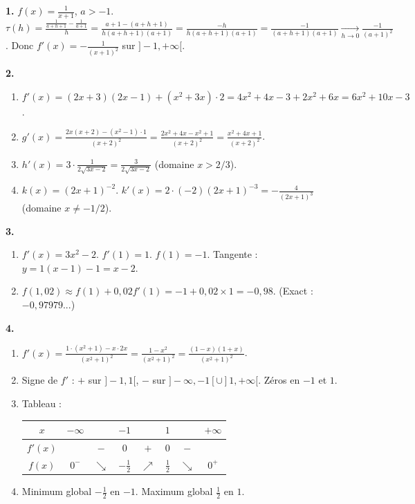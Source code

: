\documentclass[11pt]{article}
\begin{document}
\begin{corrige}
\textbf{1.} $f(x) = \frac{1}{x+1}$, $a > -1$. $\tau(h) = \frac{\frac{1}{a+h+1} - \frac{1}{a+1}}{h} = \frac{a+1 - (a+h+1)}{h(a+h+1)(a+1)} = \frac{-h}{h(a+h+1)(a+1)} = \frac{-1}{(a+h+1)(a+1)} \xrightarrow[h\to 0]{} \frac{-1}{(a+1)^2}$. Donc $f'(x) = -\frac{1}{(x+1)^2}$ sur $]-1, +\infty[$.

\textbf{2.}
\begin{enumerate}
\item $f'(x) = (2x+3)(2x-1) + (x^2+3x)\cdot 2 = 4x^2+4x-3 + 2x^2+6x = 6x^2+10x-3$.
\item $g'(x) = \frac{2x(x+2) - (x^2-1)\cdot 1}{(x+2)^2} = \frac{2x^2+4x - x^2 + 1}{(x+2)^2} = \frac{x^2+4x+1}{(x+2)^2}$.
\item $h'(x) = 3 \cdot \frac{1}{2\sqrt{3x-2}} = \frac{3}{2\sqrt{3x-2}}$ (domaine $x > 2/3$).
\item $k(x) = (2x+1)^{-2}$. $k'(x) = 2 \cdot (-2)(2x+1)^{-3} = -\frac{4}{(2x+1)^3}$ (domaine $x \neq -1/2$).
\end{enumerate}

\textbf{3.}
\begin{enumerate}
\item $f'(x) = 3x^2 - 2$. $f'(1) = 1$. $f(1) = -1$. Tangente : $y = 1(x-1) - 1 = x - 2$.
\item $f(1,02) \approx f(1) + 0,02 f'(1) = -1 + 0,02 \times 1 = -0,98$. (Exact : $-0,97979...$)
\end{enumerate}

\textbf{4.}
\begin{enumerate}
\item $f'(x) = \frac{1\cdot(x^2+1) - x\cdot 2x}{(x^2+1)^2} = \frac{1 - x^2}{(x^2+1)^2} = \frac{(1-x)(1+x)}{(x^2+1)^2}$.
\item Signe de $f'$ : $+$ sur $]-1, 1[$, $-$ sur $]-\infty, -1[ \cup ]1, +\infty[$. Zéros en $-1$ et $1$.
\item Tableau :
\begin{center}
\begin{tabular}{|c|ccccccc|}\hline
$x$ & $-\infty$ & & $-1$ & & $1$ & & $+\infty$ \\ \hline
$f'(x)$ & & $-$ & $0$ & $+$ & $0$ & $-$ & \\ \hline
$f(x)$ & $0^-$ & $\searrow$ & $-\frac{1}{2}$ & $\nearrow$ & $\frac{1}{2}$ & $\searrow$ & $0^+$ \\ \hline
\end{tabular}
\end{center}
\item Minimum global $-\frac{1}{2}$ en $-1$. Maximum global $\frac{1}{2}$ en $1$.
\end{enumerate}


\end{corrige}
\end{document}
